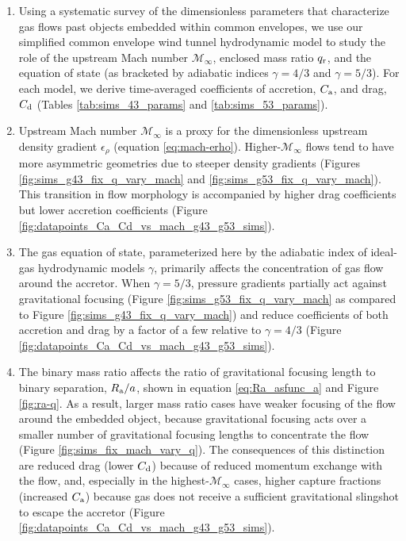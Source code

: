 \begin{enumerate}
\setlength\itemsep{1em}
\item Using a systematic survey of the dimensionless parameters that characterize gas flows past objects embedded within common envelopes, we use our simplified common envelope wind tunnel hydrodynamic model to study the role of the upstream Mach number $\mathcal{M}_\infty$, enclosed mass ratio $q_{\rm r}$, and the equation of state (as bracketed by adiabatic indices $\gamma=4/3$ and $\gamma=5/3$). For each model, we derive time-averaged coefficients of accretion, $C_{\rm a}$, and drag, $C_{\rm d}$ (Tables \ref{tab:sims_43_params} and \ref{tab:sims_53_params}).

\item Upstream Mach number $\mathcal{M}_\infty$ is a proxy for the dimensionless upstream density gradient $\epsilon_\rho$ (equation \ref{eq:mach-erho}). Higher-$\mathcal{M}_\infty$ flows tend to have more asymmetric geometries due to steeper density gradients (Figures \ref{fig:sims_g43_fix_q_vary_mach} and \ref{fig:sims_g53_fix_q_vary_mach}). This transition in flow morphology is accompanied by higher drag coefficients but lower accretion coefficients (Figure \ref{fig:datapoints_Ca_Cd_vs_mach_g43_g53_sims}). 

\item The gas equation of state, parameterized here by the adiabatic index of ideal-gas hydrodynamic models $\gamma$, primarily affects the concentration of gas flow around the accretor. When $\gamma = 5/3$, pressure gradients partially act against gravitational focusing (Figure \ref{fig:sims_g53_fix_q_vary_mach} as compared to Figure \ref{fig:sims_g43_fix_q_vary_mach}) and reduce coefficients of both accretion and drag by a factor of a few relative to $\gamma=4/3$ (Figure \ref{fig:datapoints_Ca_Cd_vs_mach_g43_g53_sims}). 

\item The binary mass ratio affects the ratio of gravitational focusing length to binary separation, $R_{\rm a}/a$, shown in equation \eqref{eq:Ra_asfunc_a} and Figure \ref{fig:ra-q}. As a result, larger mass ratio cases have weaker focusing of the flow around the embedded object, because gravitational focusing acts over a smaller number of gravitational focusing lengths to concentrate the flow (Figure \ref{fig:sims_fix_mach_vary_q}). The consequences of this distinction are reduced drag (lower $C_{\rm d}$) because of reduced momentum exchange with the flow, and, especially in the highest-$\mathcal{M}_\infty$ cases, higher capture fractions (increased $C_{\rm a}$) because gas does not receive a sufficient gravitational slingshot to escape the accretor (Figure \ref{fig:datapoints_Ca_Cd_vs_mach_g43_g53_sims}).


\end{enumerate}

